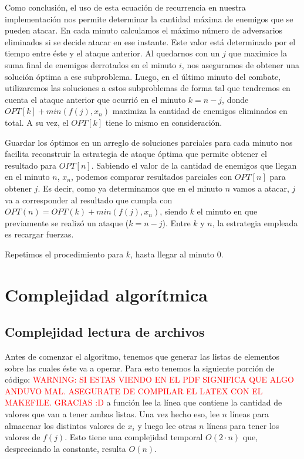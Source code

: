 \documentclass{article}
\newcommand{\funcionArchivo}[2]{%
  {\textcolor{red}{WARNING: SI ESTAS VIENDO EN EL PDF SIGNIFICA QUE ALGO ANDUVO MAL. ASEGURATE DE COMPILAR EL LATEX CON EL MAKEFILE. GRACIAS :D}}
  }%
\begin{document}
Como conclusión, el uso de esta ecuación de recurrencia en nuestra implementación nos permite determinar la cantidad máxima de enemigos que se pueden atacar. En cada minuto calculamos el  máximo número de adversarios eliminados si se decide atacar en ese instante. Este valor está determinado por el tiempo entre éste y el ataque anterior. Al quedarnos con un $j$ que maximice la suma final de enemigos derrotados en el minuto $i$, nos aseguramos de obtener una solución óptima a ese subproblema. Luego, en el último minuto del combate, utilizaremos las soluciones a estos subproblemas de forma tal que tendremos en cuenta el ataque anterior que ocurrió en el minuto $k = n - j$, donde $OPT[k] + min(f(j), x_n)$ maximiza la cantidad de enemigos eliminados en total. A su vez, el $OPT[k]$ tiene lo mismo en consideración. 

Guardar los óptimos en un arreglo de soluciones parciales para cada minuto nos facilita reconstruir la estrategia de ataque óptima que permite obtener el resultado para $OPT[n]$. Sabiendo el valor de la cantidad de enemigos que llegan en el minuto $n$, $x_n$, podemos comparar resultados parciales con $OPT[n]$ para obtener $j$. Es decir, como ya determinamos que en el minuto $n$ vamos a atacar, $j$ va a corresponder al resultado que cumpla con $OPT(n) = OPT(k) + min(f(j), x_n)$, siendo $k$ el minuto en que previamente se realizó un ataque ($k = n - j$). Entre $k$ y $n$, la estrategia empleada es recargar fuerzas.

Repetimos el procedimiento para $k$, hasta llegar al minuto 0. 

\section{Complejidad algorítmica}
\subsection{Complejidad lectura de archivos}
Antes de comenzar el algoritmo, tenemos que generar las listas de elementos sobre las cuales éste va a operar.
Para esto tenemos la siguiente porción de código:
\funcionArchivo{codigo/archivos.py generarTestDe}

La función lee la línea que contiene la cantidad de valores que van a tener ambas listas. Una vez hecho eso, lee $n$ líneas para almacenar los distintos valores de $x_i$ y luego lee otras $n$ líneas para tener los valores de $f(j)$. Esto tiene una complejidad temporal $O(2\cdot n)$ que, despreciando la constante, resulta $O(n)$.
\end{document}
